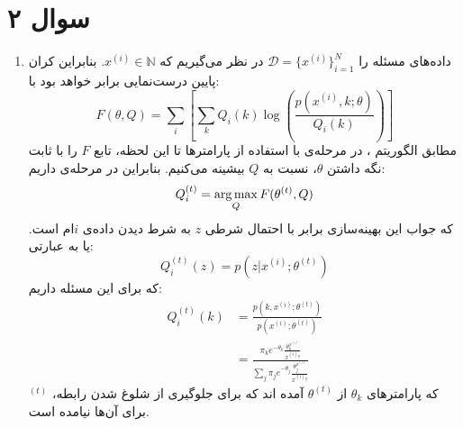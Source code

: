 \documentclass[a4paper, 12pt]{article}
\begin{document}
\section*{سوال ۲}
\begin{enumerate}
	\item
	داده‌های مسئله را 
	$\mathcal{D} = \{x^{(i)}\}_{i=1}^{N}$
	در نظر می‌گیریم که 
	$x^{(i)}\in \mathbb{N}$.
	بنابراین کران پایین درست‌نمایی برابر خواهد بود با:
	\[
	F(\theta, Q) = \sum_i\left[\sum_k Q_i(k) \log\left(\frac{p(x^{(i)}, k; \theta)}{Q_i(k)}\right) \right]
	\]
	مطابق الگوریتم ، در مرحله‌ی  با استفاده از پارامترها تا این لحظه، تابع $F$ را با ثابت نگه داشتن $\theta$، نسبت به $Q$ بیشینه می‌کنیم. بنابراین در مرحله‌ی  داریم:
	\[
	Q_i^{(t)} = \operatorname*{arg\,max}_Q F(\theta^{(t)}, Q)
	\]
	که جواب این بهینه‌سازی برابر با احتمال شرطی $z$ به شرط دیدن داده‌ی $i$ام است. یا به عبارتی:
	\[
	Q_i^{(t)}(z) = p(z|x^{(i)}; \theta^{(t)})
	\]
	که برای این مسئله داریم:
	\[
	\begin{aligned}
		Q_i^{(t)}(k) &= \frac{p(k, x^{(i)}; \theta^{(t)})}{p(x^{(i)}; \theta^{(t)})} \\[0.6em]
		&= \boxed{\frac{\pi_k e^{-\theta_k}\frac{\theta_k^{x^{(i)}}}{x^{(i)}!}}{\sum_j \pi_j e^{-\theta_j}\frac{\theta_j^{x^{(i)}}}{x^{(i)}!}}}
	\end{aligned}
	\]
	که پارامترهای $\theta_k$ از $\theta^{(t)}$ آمده اند که برای جلوگیری از شلوغ شدن رابطه،
	$^{(t)}$
	برای آن‌ها نیامده است.
	

\end{enumerate}
\end{document}
